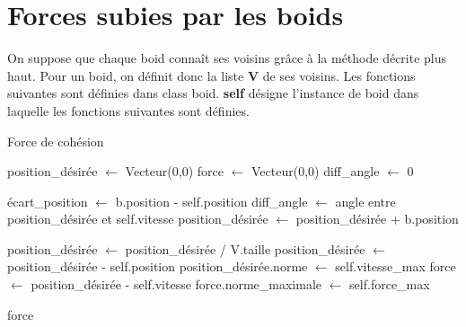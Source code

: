 \documentclass{article}
\begin{document}
\section{Forces subies par les boids}

On suppose que chaque boid connaît ses voisins grâce à la méthode décrite plus haut.
Pour un boid, on définit donc la liste \textbf{V} de ses voisins. Les fonctions suivantes sont définies dans class boid.
\textbf{self} désigne l’instance de boid dans laquelle les fonctions suivantes sont définies.

\begin{algorithm}[H]
    \caption{Force de cohésion}
    \begin{algorithmic}
        \STATE position\_désirée $\leftarrow$ Vecteur(0,0)
        \STATE force $\leftarrow$ Vecteur(0,0)
        \STATE diff\_angle $\leftarrow$ 0

        \medbreak

        \STATE écart\_position $\leftarrow$ b.position - self.position
        \STATE diff\_angle $\leftarrow$ angle entre position\_désirée et self.vitesse
        \STATE position\_désirée $\leftarrow$ position\_désirée + b.position
        \ENDIF
        \ENDFOR


        \medbreak

        \STATE position\_désirée $\leftarrow$ position\_désirée / V.taille
        \STATE position\_désirée $\leftarrow$ position\_désirée - self.position
        \STATE position\_désirée.norme $\leftarrow$ self.vitesse\_max
        \STATE force $\leftarrow$ position\_désirée - self.vitesse
        \STATE force.norme\_maximale $\leftarrow$ self.force\_max

        \ENDIF

        \medbreak

        \RETURN force


    \end{algorithmic}
\end{algorithm}
\end{document}
